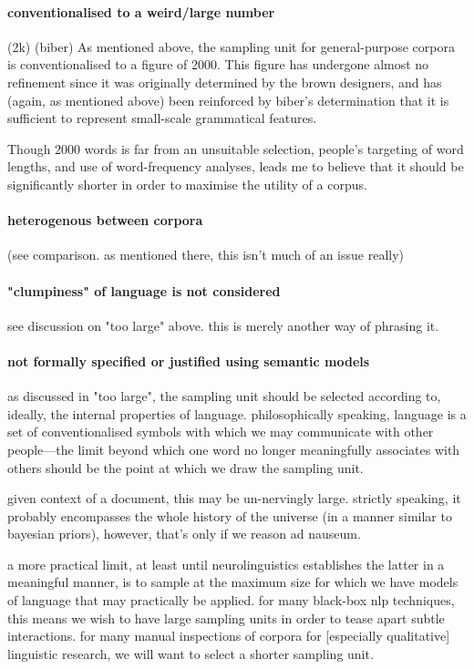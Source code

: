 \paragraph{conventionalised to a weird/large number}
(2k) (biber)
As mentioned above, the sampling unit for general-purpose corpora is conventionalised to a figure of 2000. This figure has undergone almost no refinement since it was originally determined by the brown designers, and has (again, as mentioned above) been reinforced by biber's determination that it is sufficient to represent small-scale grammatical features.

Though 2000 words is far from an unsuitable selection, people's targeting of word lengths, and use of word-frequency analyses, leads me to believe that it should be significantly shorter in order to maximise the utility of a corpus.



\paragraph{heterogenous between corpora }
(see comparison.  as mentioned there, this isn't much of an issue really)



\paragraph{"clumpiness" of language is not considered}
see discussion on "too large" above.  this is merely another way of phrasing it.


\paragraph{not formally specified or justified using semantic models}
as discussed in "too large", the sampling unit should be selected according to, ideally, the internal properties of language.  philosophically speaking, language is a set of conventionalised symbols with which we may communicate with other people---the limit beyond which one word no longer meaningfully associates with others should be the point at which we draw the sampling unit.

given context of a document, this may be un-nervingly large.  strictly speaking, it probably encompasses the whole history of the universe (in a manner similar to bayesian priors), however, that's only if we reason ad nauseum.

a more practical limit, at least until neurolinguistics establishes the latter in a meaningful manner, is to sample at the maximum size for which we have models of language that may practically be applied.  for many black-box nlp techniques, this means we wish to have large sampling units in order to tease apart subtle interactions.  for many manual inspections of corpora for [especially qualitative] linguistic research, we will want to select a shorter sampling unit.



